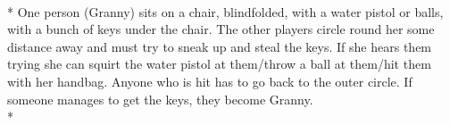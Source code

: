 \begin{minipage}{\textwidth}
\\*
One person (Granny) sits on a chair, blindfolded, with a water pistol or balls, with a bunch of keys under the chair.  The other players circle round her some distance away and must try to sneak up and steal the keys.  If she hears them trying she can squirt the water pistol at them/throw a ball at them/hit them with her handbag.  Anyone who is hit has to go back to the outer circle.  If someone manages to get the keys, they become Granny.\\*
\end{minipage}    \vfill
